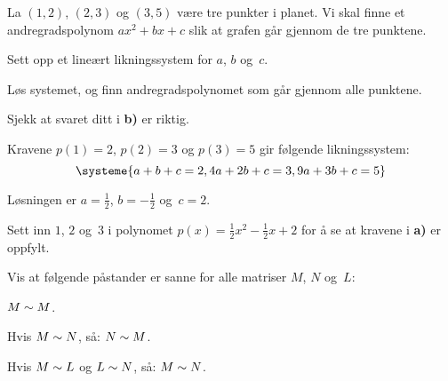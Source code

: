 \begin{oppgave}
La $(1,2)$, $(2,3)$ og $(3,5)$ være tre punkter i planet. Vi skal
finne et andregradspolynom $ax^2 + bx + c$ slik at grafen går gjennom
de tre punktene.
\begin{center}
\vspace{-5pt}
\end{center}
\begin{punkt}
Sett opp et lineært likningssystem for $a$, $b$ og~$c$.
\end{punkt}
\begin{punkt}
Løs systemet, og finn andregradspolynomet som går gjennom alle punktene.
\end{punkt}
\begin{punkt}
Sjekk at svaret ditt i \textbf{b)} er riktig.
\end{punkt}
\end{oppgave}

\begin{losning}
	\begin{punkt}
		Kravene $p(1)=2$, $p(2)=3$ og $p(3)=5$ gir følgende likningssystem:
		$$
		\systeme{
			a+b+c = 2,
			4a+2b+c = 3,
			9a+3b+c = 5
		}
		$$
		
	\end{punkt}
	\begin{punkt}
		Løsningen er $a=\frac{1}{2}$, $b=-\frac{1}{2}$ og~$c=2$.
	\end{punkt}
	
	\begin{punkt}
		Sett inn $1$, $2$ og~$3$ i polynomet $p(x)=\frac{1}{2}x^2-\frac{1}{2}x+2$ for å se at kravene i \textbf{a)} er oppfylt.  
	\end{punkt}
\end{losning}


\begin{oppgave}
Vis at følgende påstander er sanne for alle matriser $M$, $N$ og~$L$:
\begin{punkt}
$M \sim M$.
\end{punkt}
\begin{punkt}
Hvis $M \sim N$, så: $N \sim M$.
\end{punkt}
\begin{punkt}
Hvis $M \sim L$ og $L \sim N$, så: $M \sim N$.
\end{punkt}
\end{oppgave}

